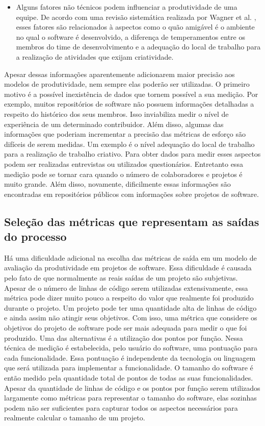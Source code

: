 \begin{itemize}
\item Alguns fatores não técnicos podem influenciar a produtividade de uma equipe. De acordo com uma revisão sistemática realizada por Wagner et al. \cite{wagner2018systematic}, esses fatores são relacionados à aspectos como o quão amigável é o ambiente no qual o software é desenvolvido, a diferença de temperamentos entre os membros do time de desenvolvimento e a adequação do local de trabalho para a realização de atividades que exijam criatividade.


\end{itemize}


Apesar dessas informações aparentemente adicionarem maior precisão aos modelos de produtividade, nem sempre elas poderão ser utilizadas. O primeiro motivo é a possível inexistência de dados que tornem possível a sua medição. Por exemplo, muitos repositórios de software não possuem informações detalhadas a respeito do histórico dos seus membros. Isso inviabiliza medir o nível de experiência de um determinado contribuidor. Além disso, algumas das informações que poderiam incrementar a precisão das métricas de esforço são difíceis de serem medidas. Um exemplo é o nível  adequação do local de trabalho  para a realização de trabalho criativo. Para obter dados para medir esses aspectos podem ser realizadas entrevistas ou utilizados questionários. Entretanto essa medição pode se tornar cara quando o número de colaboradores e projetos é muito grande. Além disso, novamente, dificilmente essas informações são encontradas em repositórios públicos com informações sobre projetos de software.

\subsection{Seleção das métricas que representam as saídas do processo}
\label{modelo_concreto_saidas}

Há uma dificuldade adicional na escolha das métricas de saída em um modelo de avaliação da produtividade em projetos de software. Essa dificuldade é causada pelo fato de que normalmente as reais saídas de um projeto são subjetivas. Apesar de o número de linhas de código serem utilizadas extensivamente, essa métrica pode dizer muito pouco a respeito do valor que realmente foi produzido durante o projeto. Um projeto pode ter uma quantidade alta de linhas de código e ainda assim não atingir seus objetivos. Com isso, uma métrica que considere os objetivos do projeto de software pode ser mais adequada para medir o que foi produzido. Uma das alternativas é a utilização dos pontos por função. Nessa técnica de medição é estabelecida, pelo usuário do software, uma pontuação para cada funcionalidade. Essa pontuação é independente da tecnologia ou linguagem que será utilizada para implementar a funcionalidade. O tamanho do software é então medido pela quantidade total de pontos de todas as suas funcionalidades\cite{jeffery1997function}. Apesar da quantidade de linhas de código e os pontos por função serem utilizados largamente como métricas para representar o tamanho do software, elas sozinhas podem não ser suficientes para capturar todos os aspectos necessários para realmente calcular o tamanho de um projeto. 

